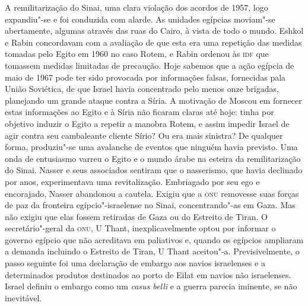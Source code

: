 A remilitarização do Sinai, uma clara violação dos acordos de 1957, logo
expandiu"-se e foi conduzida com alarde. As unidades egípcias moviam"-se
abertamente, algumas através das ruas do Cairo, à vista de todo o mundo.
Eshkol e Rabin concordavam com a avaliação de que esta era uma repetição
das medidas tomadas pelo Egito em 1960 no caso Rotem, e Rabin ordenou às
\textsc{idf} que tomassem medidas limitadas de precaução. Hoje sabemos que a ação
egípcia de maio de 1967 pode ter sido provocada por informações falsas,
fornecidas pala União Soviética, de que Israel havia concentrado pelo
menos onze brigadas, planejando um grande ataque contra a Síria. A
motivação de Moscou em fornecer estas informações ao Egito e à Síria não
ficaram claras até hoje: tinha por objetivo induzir o Egito a repetir a
manobra Rotem, e assim impedir Israel de agir contra seu cambaleante
cliente Sírio? Ou era mais sinistra? De qualquer forma, produziu"-se uma
avalanche de eventos que ninguém havia previsto. Uma onda de entusiasmo
varreu o Egito e o mundo árabe na esteira da remilitarização do Sinai.
Nasser e seus associados sentiram que o nasserismo, que havia declinado
por anos, experimentava uma revitalização. Embriagado por seu ego e
encorajado, Nasser abandonou a cautela. Exigiu que a \textsc{onu} removesse suas
forças de paz da fronteira egípcio"-israelense no Sinai, concentrando"-as
em Gaza. Mas não exigiu que elas fossem retiradas de Gaza ou do
Estreito de Tiran. O secretário"-geral da \textsc{onu}, U Thant,
inexplicavelmente optou por informar o governo egípcio que não
acreditava em paliativos e, quando os egípcios ampliaram a demanda
incluindo o Estreito de Tiran, U Thant aceitou"-a. Previsivelmente, o
passo seguinte foi uma declaração de embargo aos navios israelenses e a
determinados produtos destinados ao porto de Eilat em navios
não israelenses. Israel definiu o embargo como um \emph{casus belli}
e a guerra parecia iminente, se não inevitável.

